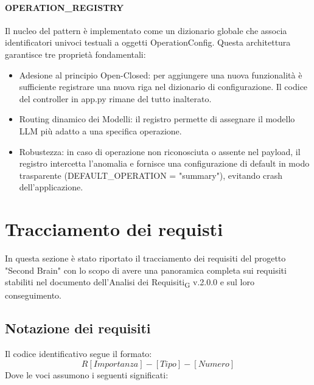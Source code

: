 \documentclass[11pt,a4paper]{article}
\newcommand{\gls}[1]{#1\textsubscript{G}}
\begin{document}
\paragraph{OPERATION\_REGISTRY}
Il nucleo del pattern è implementato come un dizionario globale che associa identificatori univoci testuali a oggetti OperationConfig. Questa architettura garantisce tre proprietà fondamentali:
\begin{itemize}
    \item Adesione al principio Open-Closed: per aggiungere una nuova funzionalità è sufficiente registrare una nuova riga nel dizionario di configurazione. Il codice del controller in app.py rimane del tutto inalterato.
    \item Routing dinamico dei Modelli: il registro permette di assegnare il modello LLM più adatto a una specifica operazione.
    \item Robustezza: in caso di operazione non riconosciuta o assente nel payload, il registro intercetta l'anomalia e fornisce una configurazione di default in modo trasparente (DEFAULT\_OPERATION = "summary"), evitando crash dell'applicazione.

\end{itemize}








\section{Tracciamento dei requisti}
In questa sezione è stato riportato il tracciamento dei requisiti del progetto "Second Brain" con lo scopo di avere una panoramica completa sui requisiti stabiliti nel documento dell'\gls{Analisi dei Requisiti} v.2.0.0 e sul loro conseguimento.

\subsection{Notazione dei requisiti}
Il codice identificativo segue il formato:
\[
R[Importanza]-[Tipo]-[Numero]
\]
Dove le voci assumono i seguenti significati:
\end{document}
